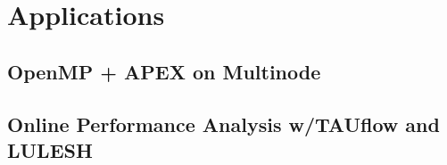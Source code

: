 
\section{Applications}


\subsection{OpenMP + APEX on Multinode}



\subsection{Online Performance Analysis w/TAUflow and LULESH}





